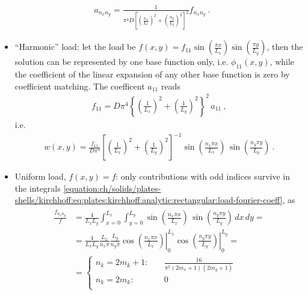 \documentclass[letterpaper,10pt,english]{jupyterBook}
\begin{document}
\begin{equation*}
\begin{split}a_{n_x n_y} = \frac{1}{ \pi^4 D \left[ \left(\frac{n_x}{L_x}\right)^2 +  \left(\frac{n_y}{L_y}\right)^2 \right]^2} f_{n_x n_y} \ .\end{split}
\end{equation*}\begin{itemize}
\item {} 
\sphinxAtStartPar
“Harmonic” load: let the load be \(f(x,y) = f_{11} \sin\left( \tfrac{\pi x}{L_x} \right) \sin \left( \tfrac{\pi y}{L_y} \right)\), then the solution can be represented by one base function only, i.e. \(\phi_{11}(x,y)\), while the coefficient of the linear expansion of any other base function is zero by coefficient matching. The coefficent \(a_{11}\) reads
\begin{equation*}
\begin{split}f_{11} = D \pi^4 \left\{ \left(\frac{1}{L_x}\right)^2 + \left(\frac{1}{L_y}\right)^2 \right\}^2 \, a_{11} \ ,\end{split}
\end{equation*}
\sphinxAtStartPar
i.e.
\begin{equation*}
\begin{split}w(x,y) = \frac{f_{11}}{D \pi^4} \left[ \left(\frac{1}{L_x}\right)^2 + \left(\frac{1}{L_y}\right)^2 \right]^{-1} \sin\left( \frac{n_x \pi x}{L_x} \right) \, \sin\left( \frac{n_y \pi y}{L_y} \right) \ .\end{split}
\end{equation*}
\item {} 
\sphinxAtStartPar
Uniform load, \(f(x,y) = f\): only contributions with odd indices survive in the integrals \eqref{equation:ch/solids/plates-shells/kirchhoff:eq:plates:kirchhoff:analytic:rectangular:load-fourier-coeff}, as
\begin{equation*}
\begin{split}\begin{aligned}
     \frac{f_{n_x n_y}}{f}
     & = \frac{4}{L_x L_y} \int_{x=0}^{L_x} \int_{y=0}^{L_y} \sin\left( \frac{n_x \pi x}{L_x} \right) \, \sin\left( \frac{n_y \pi y}{L_y} \right) \,dx \, dy = \\
     & = \frac{4}{L_x L_y} \frac{L_x}{n_x \pi} \frac{L_y}{n_y \pi} \left.\cos\left( \frac{n_x \pi x}{L_x} \right)\right|_{0}^{L_x} \left.\cos\left( \frac{n_y \pi y}{L_y} \right)\right|_{0}^{L_y} = \\
     & = \left\{ \begin{aligned}
     n_k = 2 m_k + 1: & \quad \frac{16}{\pi^2 (2m_x+1)(2m_y+1)} \\
     n_k = 2 m_k    : & \quad 0 \\
     \end{aligned} \right.
   \end{aligned}\end{split}
\end{equation*}
\end{itemize}
\end{document}
